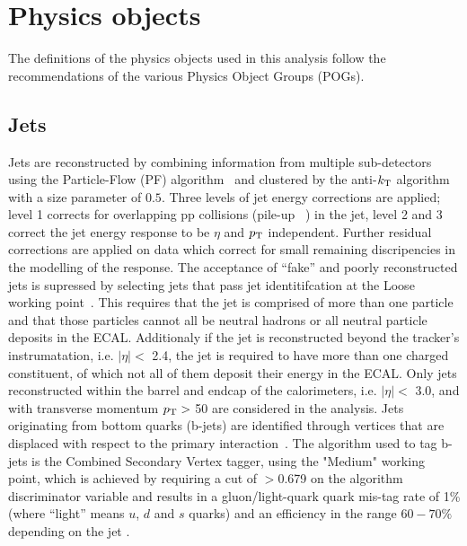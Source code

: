 \clearpage
\section{Physics objects\label{sec:reconstruction}}

The definitions of the physics objects used in this analysis follow
the recommendations of the various Physics Object Groups (POGs).

\subsection{Jets\label{recJet}}

Jets are reconstructed by combining information from multiple
sub-detectors using the Particle-Flow (PF) algorithm~\cite{PAS-PFT-09-001} 
and clustered by the anti-$k_{\rm T}$ algorithm~\cite{antikt} with
a size parameter of $0.5$. Three levels of jet energy corrections are 
applied; level 1 corrects for overlapping pp collisions 
(pile-up ~\cite{Cacciari2008119,1126-6708-2008-04-005}) in the jet, 
level 2 and 3 correct the jet energy response to be $\eta$ and $p_{\mathrm{T}}$ independent.  
Further residual corrections are applied on data which correct for 
small remaining discripencies in the modelling of the response. The acceptance of
``fake''  and poorly reconstructed jets is supressed by selecting jets that pass 
jet identitifcation at the Loose working point~\cite{ref:jet-id}. This requires 
that the jet is comprised of more than one particle and that those particles 
cannot all be neutral hadrons or all neutral particle deposits in the ECAL. 
Additionaly if the jet is reconstructed beyond the tracker's instrumatation, 
i.e. $|\eta| <$ 2.4,  the jet is required to have more than one charged constituent, 
of which not all of them deposit their energy in the ECAL. 
Only jets reconstructed within the barrel and endcap of the calorimeters,
i.e. $|\eta| <$ 3.0, and with transverse momentum $p_{\mathrm{T}} >$ 50\gev  
are considered in the analysis. Jets originating from bottom quarks 
(b-jets) are identified through vertices that are displaced with respect to the primary 
interaction~\cite{CMS-PAS-BTV-12-001}. The algorithm used to tag b-jets 
is the Combined Secondary Vertex tagger, using the "Medium" working point, 
which is achieved by requiring a cut of $>$0.679 on the algorithm discriminator 
variable and results in a gluon/light-quark quark mis-tag rate of 1\% 
(where ``light'' means $u$, $d$ and $s$ quarks) and an efficiency in the 
range $60-70\%$ depending on the jet \pt. 

